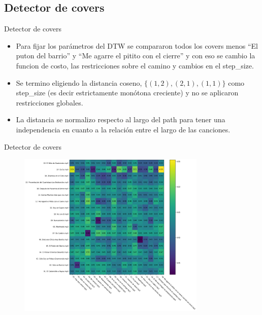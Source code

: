 \documentclass{beamer}
\begin{document}
\subsection{Detector de covers}

\begin{frame}{Detector de covers}
\begin{itemize}
    \item Para fijar los parámetros del DTW se compararon todos los covers menos ``El puton del barrio'' y ``Me agarre el pitito con el cierre'' y con eso se cambio la funcion de costo, las restricciones sobre el camino y cambios en el step\_size.
    \item Se termino eligiendo la distancia coseno, $\{ (1,2), (2,1), (1,1) \}$ como step\_size (es decir estrictamente monótona creciente) y no se aplicaron restricciones globales.
    \item La distancia se normalizo respecto al largo del path para tener una independencia en cuanto a la relación entre el largo de las canciones.
\end{itemize}
\end{frame}

\begin{frame}{Detector de covers}
    \begin{figure}
        \centering
        \includegraphics[width=0.8\textwidth]{chromas/matrix_all_vs_all.png}
    \end{figure}
    
\end{frame}
\end{document}
